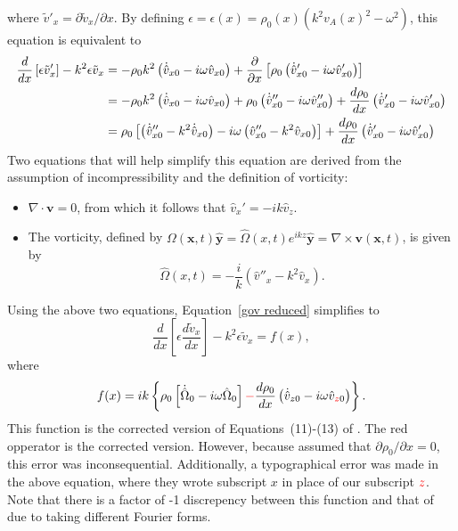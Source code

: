 \documentclass[12pt]{../style-files/ociamthesis}
\begin{document}
where $\tilde{v}'_x = \partial\tilde{v}_x/\partial x$. By defining $\epsilon = \epsilon(x) = \rho_0(x)(k^2v_A(x)^2 - \omega^2)$, this equation is equivalent to
\begin{align}
\frac{d}{dx} \left[\epsilon \tilde{v}_x'\right] - k^2\epsilon \tilde{v}_x & = - \rho_0 k^2\left(\dot{\hat{v}}_{x0} - i\omega\hat{v}_{x0}\right) + \frac{\partial}{\partial x}\left[\rho_0\left(\dot{\hat{v}}_{x0}' - i\omega\hat{v}_{x0}'\right)\right] \notag \\
& = - \rho_0 k^2\left(\dot{\hat{v}}_{x0} - i\omega\hat{v}_{x0}\right) + \rho_0\left(\dot{\hat{v}}_{x0}'' - i\omega\hat{v}_{x0}''\right) + \frac{d\rho_0}{dx}\left(\dot{\hat{v}}_{x0}' - i\omega\hat{v}_{x0}'\right) \notag \\
& = \rho_0\left[\left(\dot{\hat{v}}_{x0}'' - k^2\dot{\hat{v}}_{x0}\right) - i\omega\left(\hat{v}_{x0}'' - k^2\hat{v}_{x0}\right)\right] + \frac{d\rho_0}{dx}\left(\dot{\hat{v}}_{x0}' - i\omega\hat{v}_{x0}'\right)
\label{gov reduced}
\end{align}
Two equations that will help simplify this equation are derived from the assumption of incompressibility and the definition of vorticity:
\begin{itemize}
	\item $\nabla\cdot\mathbf{v} = 0$, from which it follows that $\hat{v}_x' = -ik \hat{v}_z$.
	\item The vorticity, defined by $\Omega(\mathbf{x},t)\mathbf{\hat{y}} = \hat{\Omega}(x,t)e^{ikz}\mathbf{\hat{y}} = \nabla \times \mathbf{v}(\mathbf{x},t)$, is given by	\begin{equation}
	\hat{\Omega}(x,t) = -\frac{i}{k}\left(\hat{v}''_x - k^2 \hat{v}_x\right).
	\end{equation}
\end{itemize}
Using the above two equations, Equation~\eqref{gov reduced} simplifies to
\begin{equation}
\frac{d}{dx} \left[\epsilon \frac{d \tilde{v}_x}{d x}\right] - k^2\epsilon \tilde{v}_x = f(x), \label{gov}
\end{equation}
where
\begin{equation}f(x) = ik\left\{\rho_0\left[\dot{\hat{\Omega}}_0 - i\omega\hat{\Omega}_0\right] \textcolor{red}{-} \frac{d\rho_0}{dx}\left(\dot{\hat{v}}_{z0} - i\omega\hat{v}_{\textcolor{red}{z}0}\right)\right\}.
\end{equation}
This function is the corrected version of Equations~(11)-(13) of \cite{rae_etal81}. The red opperator is the corrected version. However, because \cite{rae_etal81} assumed that $\partial \rho_0 / \partial x = 0$, this error was inconsequential. Additionally, a typographical error was made in the above equation, where they wrote subscript $x$ in place of our subscript $\textcolor{red}{z}$. Note that there is a factor of -1 discrepency between this function and that of \cite{rae_etal81} due to taking different Fourier forms.
\end{document}
